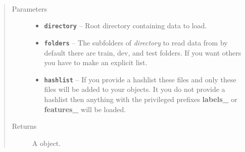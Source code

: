 \documentclass[letterpaper,10pt,english]{sphinxmanual}
\begin{document}

\begin{fulllineitems}
\label{loader:loader.read_data_sets}~\begin{quote}\begin{description}
\item[{Parameters}] \leavevmode\begin{itemize}
\item {} 
\textbf{\texttt{directory}} -- Root directory containing data to load.

\item {} 
\textbf{\texttt{folders}} -- The subfolders of \emph{directory} to read data from by default there are train, dev, and test folders. If you want others you have to make an explicit list.

\item {} 
\textbf{\texttt{hashlist}} -- If you provide a hashlist these files and only these files will be added to your {\hyperref[loader:loader.DataSet]{\emph{}}} objects.
It you do not provide a hashlist then anything with
the privileged prefixes {\color{red}\bfseries{}labels\_} or {\color{red}\bfseries{}features\_} will be loaded.

\end{itemize}

\item[{Returns}] \leavevmode
A {\hyperref[loader:loader.DataSets]{\emph{}}} object.

\end{description}\end{quote}

\end{fulllineitems}

\end{document}
